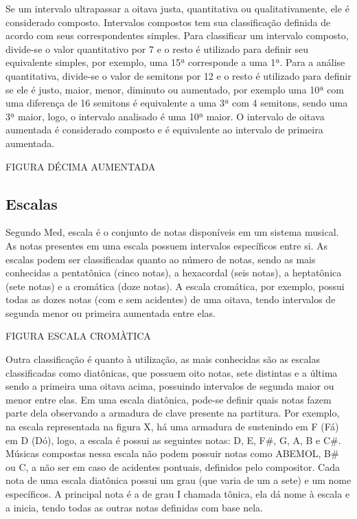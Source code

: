         Se um intervalo ultrapassar a oitava justa, quantitativa ou qualitativamente, ele é considerado composto. Intervalos compostos tem sua classificação definida de acordo com seus correspondentes simples. Para classificar um intervalo composto, divide-se o valor quantitativo por 7 e o resto é utilizado para definir seu equivalente simples, por exemplo, uma 15ª corresponde a uma 1ª. Para a análise quantitativa, divide-se o valor de semitons por 12 e o resto é utilizado para definir se ele é justo, maior, menor, diminuto ou aumentado, por exemplo uma 10ª com uma diferença de 16 semitons é equivalente a uma 3ª com 4 semitons, sendo uma 3ª maior, logo, o intervalo analisado é uma 10ª maior. O intervalo de oitava aumentada é considerado composto e é equivalente ao intervalo de primeira aumentada.

        FIGURA DÉCIMA AUMENTADA

    \subsection[Escalas]{Escalas}

      Segundo Med, escala é o conjunto de notas disponíveis em um sistema musical. As notas presentes em uma escala possuem intervalos específicos entre si. As escalas podem ser classificadas quanto ao número de notas, sendo as mais conhecidas a pentatônica (cinco notas), a hexacordal (seis notas), a heptatônica (sete notas) e a cromática (doze notas). A escala cromática, por exemplo, possui todas as dozes notas (com e sem acidentes) de uma oitava, tendo intervalos de segunda menor ou primeira aumentada entre elas.

      FIGURA ESCALA CROMÀTICA

      Outra classificação é quanto à utilização, as mais conhecidas são as escalas classificadas como diatônicas, que possuem oito notas, sete distintas e a última sendo a primeira uma oitava acima, possuindo intervalos de segunda maior ou menor entre elas. Em uma escala diatônica, pode-se definir quais notas fazem parte dela observando a armadura de clave presente na partitura. Por exemplo, na escala representada na figura X, há uma armadura de sustenindo em F (Fá) em D (Dó), logo, a escala é possui as seguintes notas: D, E, F\#, G, A, B e C\#. Músicas compostas nessa escala não podem possuir notas como ABEMOL, B\# ou C, a não ser em caso de acidentes pontuais, definidos pelo compositor. Cada nota de uma escala diatônica possui um grau (que varia de um a sete) e um nome específicos. A principal nota é a de grau I chamada tônica, ela dá nome à escala e a inicia, tendo todas as outras notas definidas com base nela.


